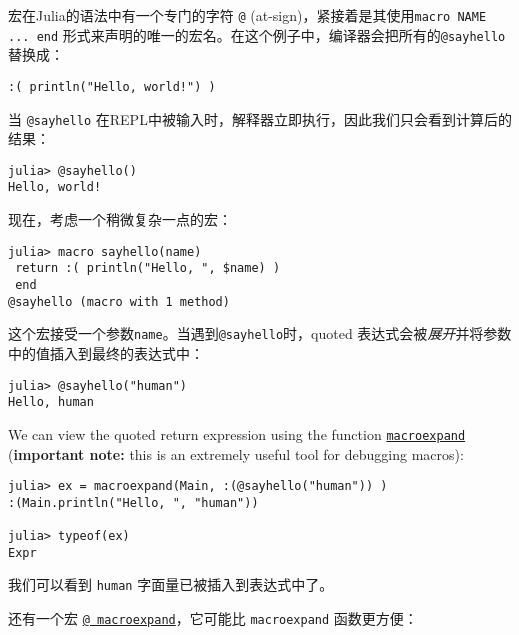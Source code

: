 宏在Julia的语法中有一个专门的字符 \texttt{@} (at-sign)，紧接着是其使用\texttt{macro NAME ... end} 形式来声明的唯一的宏名。在这个例子中，编译器会把所有的\texttt{@sayhello} 替换成：




\begin{verbatim}
:( println("Hello, world!") )
\end{verbatim}



当 \texttt{@sayhello} 在REPL中被输入时，解释器立即执行，因此我们只会看到计算后的结果：




\begin{verbatim}
julia> @sayhello()
Hello, world!
\end{verbatim}



现在，考虑一个稍微复杂一点的宏：




\begin{verbatim}
julia> macro sayhello(name)
 return :( println("Hello, ", $name) )
 end
@sayhello (macro with 1 method)
\end{verbatim}



这个宏接受一个参数\texttt{name}。当遇到\texttt{@sayhello}时，quoted 表达式会被\emph{展开}并将参数中的值插入到最终的表达式中：




\begin{verbatim}
julia> @sayhello("human")
Hello, human
\end{verbatim}



We can view the quoted return expression using the function \hyperlink{8018172489611994488}{\texttt{macroexpand}} (\textbf{important note:} this is an extremely useful tool for debugging macros):




\begin{lstlisting}
julia> ex = macroexpand(Main, :(@sayhello("human")) )
:(Main.println("Hello, ", "human"))

julia> typeof(ex)
Expr
\end{lstlisting}



我们可以看到 \texttt{{\textquotedbl}human{\textquotedbl}} 字面量已被插入到表达式中了。



还有一个宏 \href{@ ref}{\texttt{@ macroexpand}}，它可能比 \texttt{macroexpand} 函数更方便：




